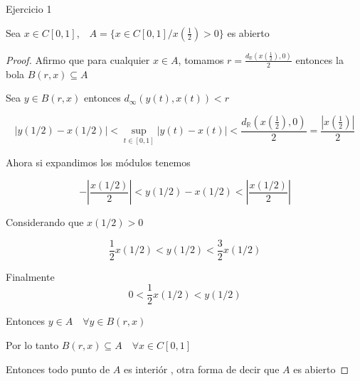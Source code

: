 \documentclass[12pt]{article}
\newcommand{\R}{\mathbb{R}}
\theoremstyle{definition}
\begin{document}
Ejercicio 1

Sea $x \in C[0,1]$,$\quad A = \{x \in C[0,1 ] / x(\frac{1}{2}) > 0\}$ es abierto

\begin{proof}
  Afirmo que para cualquier $x \in A$, tomamos $r = \frac{d_{\R}(x(\frac{1}{2}),0)}{2}$ entonces la bola $B(r,x) \subseteq A$ 

  Sea $y \in B(r,x)$ entonces $d_{\infty}(y(t),x(t)) < r$

  $$|y(1/2) - x(1/2) |  < \sup_{t \in [0,1]} |y(t) - x(t)| <  \frac{d_{\R}(x(\frac{1}{2}),0)}{2} = \frac{|x(\frac{1}{2})|}{2}$$

 Ahora si expandimos los módulos tenemos

 $$ - \left |\frac{x(1/2)}{2} \right | < y(1/2) - x(1/2) < \left |\frac{x(1/2)}{2} \right |$$

Considerando que $x(1/2) > 0$

$$\frac{1}{2}x(1/2) <  y(1/2) < \frac{3}{2} x(1/2)$$

Finalmente $$0 < \frac{1}{2} x(1/2) < y(1/2)$$

Entonces $y \in A \quad \forall y \in B(r,x)$

Por lo tanto $B(r,x) \subseteq A \quad \forall x \in C[0,1]$ 

Entonces todo punto de $A$ es interiór , otra forma de decir que $A$ es abierto
\end{proof}
\end{document}
